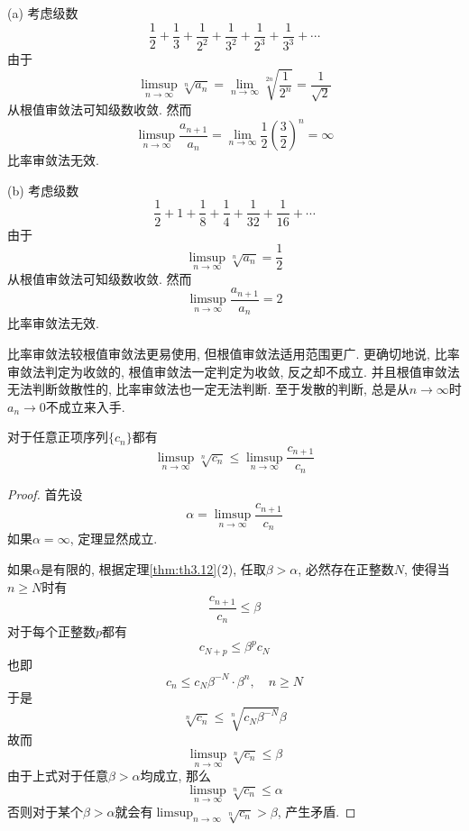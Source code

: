 \documentclass[cn,12pt,math=mtpro2,citestyle=gb7714-2015,bibstyle=gb7714-2015,twocol]{elegantbook}
\newcommand{\limn }{\lim_{n\to\infty}}
\begin{document}
\begin{example}
(a) 考虑级数
$$\frac{1}{2}+\frac{1}{3}+\frac{1}{2^2}+\frac{1}{3^2}+\frac{1}{2^3}+\frac{1}{3^3}+\cdots$$
由于
$$\displaystyle\limsup_{n\to\infty}\sqrt[n]{a_n}=\limn \sqrt[2n]{\frac{1}{2^n}}=\frac{1}{\sqrt{2}}$$
从根值审敛法可知级数收敛. 然而
$$\displaystyle\limsup_{n\to\infty}\frac{a_{n+1}}{a_n}=\limn \frac{1}{2}\left(\frac{3}{2}\right)^n=\infty$$
 比率审敛法无效.

 (b) 考虑级数
 $$\frac{1}{2}+1+\frac{1}{8}+\frac{1}{4}+\frac{1}{32}+\frac{1}{16}+\cdots$$
 由于
 $$\displaystyle\limsup_{n\to\infty}\sqrt[n]{a_n}=\frac{1}{2}$$
从根值审敛法可知级数收敛. 然而
$$\displaystyle\limsup_{n\to\infty}\frac{a_{n+1}}{a_n}=2$$
 比率审敛法无效.
\end{example}
\begin{remark}
比率审敛法较根值审敛法更易使用, 但根值审敛法适用范围更广. 更确切地说, 比率审敛法判定为收敛的, 根值审敛法一定判定为收敛, 反之却不成立. 并且根值审敛法无法判断敛散性的, 比率审敛法也一定无法判断. 至于发散的判断, 总是从$n\rightarrow\infty$时$a_n\rightarrow0$不成立来入手.
\end{remark}
\begin{theorem}
  对于任意正项序列$\{c_n\}$都有
  $$\limsup_{n\to\infty}\sqrt[n]{c_n}\leq\limsup_{n\to\infty}\frac{c_{n+1}}{c_n}$$
\end{theorem}
\begin{proof}
  首先设$$\displaystyle\alpha=\limsup_{n\to\infty}\frac{c_{n+1}}{c_n}$$ 如果$\alpha=\infty$, 定理显然成立.

  如果$\alpha$是有限的, 根据定理\ref{thm:th3.12}(2), 任取$\beta>\alpha$, 必然存在正整数$N$, 使得当$n\geq N$时有
  $$\frac{c_{n+1}}{c_n}\leq \beta$$
  对于每个正整数$p$都有
  $$c_{N+p}\leq \beta^p c_N$$
  也即
  $$c_n\leq c_N\beta^{-N}\cdot \beta^n, \quad n\geq N$$
  于是
  $$\sqrt[n]{c_n}\leq\sqrt[n]{c_N\beta^{-N}}\beta$$
  故而
  $$\limsup_{n\to\infty}\sqrt[n]{c_n}\leq\beta$$
  由于上式对于任意$\beta>\alpha$均成立, 那么
  $$\limsup_{n\to\infty}\sqrt[n]{c_n}\leq\alpha$$
  否则对于某个$\beta>\alpha$就会有$\limsup_{n\to\infty}\sqrt[n]{c_n}>\beta$, 产生矛盾.
\end{proof}
\end{document}
